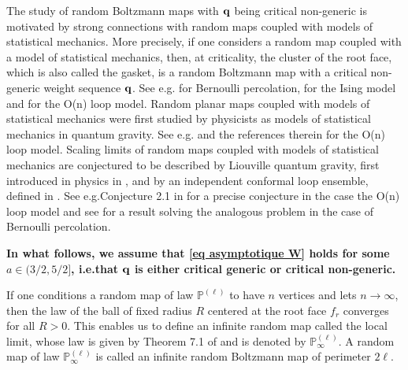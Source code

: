 \documentclass[11pt]{article}
\numberwithin{equation}{section}
\def\P{\mathbb{P}}
\begin{document}
{The study of random Boltzmann maps with $\bf q$ being critical non-generic is motivated by strong connections with random maps coupled with models of statistical mechanics. More precisely, if one considers a random map coupled with a model of statistical mechanics, then, at criticality, the cluster of the root face, which is also called the gasket, is a random Boltzmann map with a critical non-generic weight sequence $\bf q$. See e.g.\@ \cite{BCM19} for Bernoulli percolation, \cite{AM22} for the Ising model and \cite{BBG12} for the O(n) loop model. Random planar maps coupled with models of statistical mechanics were first studied by physicists as models of statistical mechanics in quantum gravity. See e.g.\@ \cite{EK95} and the references therein for the O(n) loop model. Scaling limits of random maps coupled with models of statistical mechanics are conjectured to be described by Liouville quantum gravity, first introduced in physics in \cite{Pol81}, and by an independent conformal loop ensemble, defined in \cite{S09,SW12}. See e.g.\@ Conjecture 2.1 in \cite{HL24} for a precise conjecture in the case the O(n) loop model and see \cite{GHS21} for a result solving the analogous problem in the case of Bernoulli percolation.  
	
\textbf{In what follows, we assume that \eqref{eq asymptotique W} holds for some $a \in (3/2,5/2]$, i.e.\@ that $\bf q$ is either critical generic or critical non-generic.}}


If one conditions a random map of law $\P^{(\ell)}$ to have $n$ vertices and let{s} $n\to \infty$, {then the law of the ball of fixed radius $R$ centered at the root face $f_r$ converges for all $R>0$. This enables {us} to define an infinite random map called the local limit, whose law is given by} Theorem 7.1 of \cite{StFlour} and is denoted by $\P^{(\ell)}_\infty$. A random map of law $\P^{(\ell)}_\infty$ is called an infinite random Boltzmann map of perimeter $2\ell$. 
\end{document}
